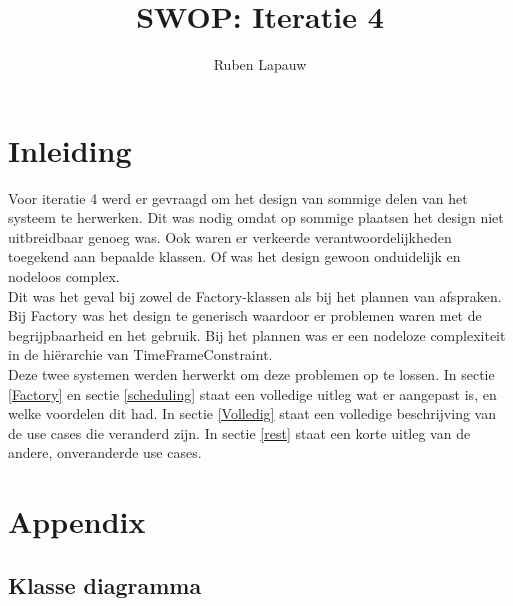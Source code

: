 \documentclass[a4paper,10pt]{article}
\title{SWOP: Iteratie 4}
\author{Ruben Lapauw}
\date{}
\begin{document}
\maketitle
 \thispagestyle{empty}
\newpage
 \setcounter{page}{1}
\section{Inleiding}
Voor iteratie 4 werd er gevraagd om het design van sommige delen van het systeem te herwerken. 
Dit was nodig omdat op sommige plaatsen het design niet uitbreidbaar genoeg was. 
Ook waren er verkeerde verantwoordelijkheden toegekend aan bepaalde klassen. 
Of was het design gewoon onduidelijk en nodeloos complex. \\

Dit was het geval bij zowel de Factory-klassen als bij het plannen van afspraken. 
Bij Factory was het design te generisch waardoor er problemen waren met de begrijpbaarheid en het gebruik.
Bij het plannen was er een nodeloze complexiteit in de hiërarchie van TimeFrameConstraint.\\

Deze twee systemen werden herwerkt om deze problemen op te lossen. 
In sectie \ref{Factory} en sectie \ref{scheduling} staat een volledige uitleg wat er aangepast is, en welke voordelen dit had.
In sectie \ref{Volledig} staat een volledige beschrijving van de use cases die veranderd zijn.
In sectie \ref{rest} staat een korte uitleg van de andere, onveranderde use cases.



\section{Appendix}
\subsection{Klasse diagramma}
 
 
\end{document}
